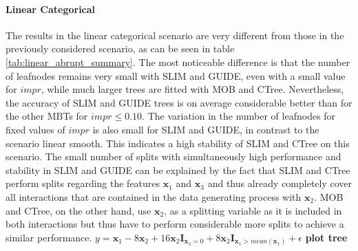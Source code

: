 \paragraph{Linear Categorical} 
The results in the linear categorical scenario are very different from those in the previously considered scenario, as can be seen in table \ref{tab:linear_abrupt_summary}. The most noticeable difference is that the number of leafnodes remains very small with SLIM and GUIDE, even with a small value for $impr$, while much larger trees are fitted with MOB and CTree. Nevertheless, the accuracy of SLIM and GUIDE trees is on average considerable better than for the other MBTs for $impr \leq 0.10$.
The variation in the number of leafnodes for fixed values of $impr$ is also small for SLIM and GUIDE, in contrast to the scenario linear smooth. This indicates a high stability of SLIM and CTree on this scenario. 
The small number of splits with simultaneously high performance and stability in SLIM and GUIDE can be explained by the fact that SLIM and CTree perform splits regarding the features $\textbf{x}_1$ and $\textbf{x}_3$ and thus already completely cover all interactions that are contained in the data generating process with $\textbf{x}_2$. MOB and CTree, on the other hand, use $\textbf{x}_2$, as a splitting variable as it is included in both interactions but thus have to perform considerable more splits to achieve a similar performance.
$ y =  \textbf{x}_{1} - 8  \textbf{x}_2 + 16  \textbf{x}_2  \mathbf{I}_{\textbf{x}_3 = 0} + 8  \textbf{x}_2  \mathbf{I}_{\textbf{x}_1 > mean(\textbf{x}_1)} + \epsilon $
\textbf{plot tree}


